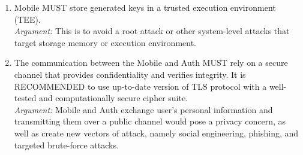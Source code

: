\begin{enumerate}
            \item Mobile MUST store generated keys in a trusted execution environment (TEE).\\        
            \textit{Argument:} This is to avoid a root attack or other system-level attacks that target storage 
                               memory or execution environment.

            \item The communication between the Mobile and Auth MUST rely on a secure channel that provides 
                  confidentiality and verifies integrity. It is RECOMMENDED to use up-to-date version of 
                  TLS protocol with a well-tested and computationally secure cipher suite.\\      
            \textit{Argument:} Mobile and Auth exchange user's personal information and transmitting them over a 
                               public channel would pose a privacy concern, as well as create new vectors of attack, 
                               namely social engineering, phishing, and targeted brute-force attacks.
    \end{enumerate}
